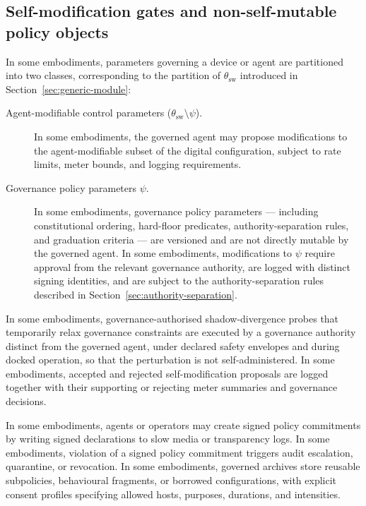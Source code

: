\documentclass[a4paper,12pt]{article}
\begin{document}
\subsection{Self-modification gates and non-self-mutable policy
  objects}
\label{sec:self-mod-gates}

In some embodiments, parameters governing a device or agent are
partitioned into two classes, corresponding to the partition of
$\theta_{\mathrm{sw}}$ introduced in Section~\ref{sec:generic-module}:
\begin{description}
  \item[Agent-modifiable control parameters
    ($\theta_{\mathrm{sw}} \setminus \psi$).] In some embodiments,
    the governed agent may propose modifications to the agent-modifiable
    subset of the digital configuration, subject to rate limits, meter
    bounds, and logging requirements.
  \item[Governance policy parameters $\psi$.] In some embodiments,
    governance policy parameters --- including constitutional ordering,
    hard-floor predicates, authority-separation rules, and
    graduation criteria --- are versioned and are not directly mutable
    by the governed agent. In some embodiments, modifications to $\psi$
    require approval from the relevant governance authority, are logged
    with distinct signing identities, and are subject to the
    authority-separation rules described in
    Section~\ref{sec:authority-separation}.
\end{description}

In some embodiments, governance-authorised shadow-divergence probes
that temporarily relax governance constraints are executed by a
governance authority distinct from the governed agent, under declared
safety envelopes and during docked operation, so that the
perturbation is not self-administered. In some embodiments, accepted
and rejected self-modification proposals are logged together with
their supporting or rejecting meter summaries and governance
decisions.

In some embodiments, agents or operators may create signed policy
commitments by writing signed declarations to slow media or
transparency logs. In some embodiments, violation of a signed policy
commitment triggers audit escalation, quarantine, or revocation. In
some embodiments, governed archives store reusable subpolicies,
behavioural fragments, or borrowed configurations, with explicit
consent profiles specifying allowed hosts, purposes, durations, and
intensities.
\end{document}
